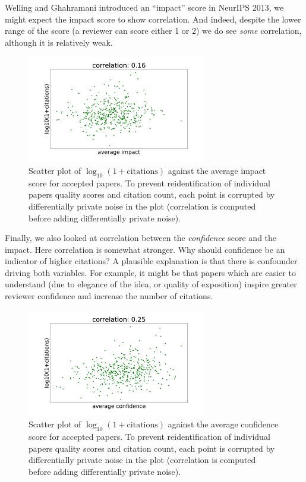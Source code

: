 Welling and Ghahramani introduced an ``impact'' score in NeurIPS 2013,
we might expect the impact score to show correlation. And indeed,
despite the lower range of the score (a reviewer can score either 1 or
2) we do see \emph{some} correlation, although it is relatively weak.

\begin{figure}[htb]
\includegraphics[width=0.70\textwidth]{diagrams/neurips/citations-vs-average-impact-accept.pdf}


\caption{Scatter plot of $\log_{10}(1+\text{citations})$ against the average impact score for accepted papers. To prevent reidentification of individual papers quality scores and citation count, each point is corrupted by differentially private noise in the plot (correlation is computed before adding differentially private noise).}
\label{citations-vs-average-impact-accept}
\end{figure}

Finally, we also looked at correlation between the \emph{confidence}
score and the impact. Here correlation is somewhat stronger. Why should
confidence be an indicator of higher citations? A plausible explanation
is that there is confounder driving both variables. For example, it
might be that papers which are easier to understand (due to elegance of
the idea, or quality of exposition) inspire greater reviewer confidence
and increase the number of citations.

\begin{figure}[htb]
\includegraphics[width=0.70\textwidth]{diagrams/neurips/citations-vs-average-confidence-accept.pdf}


\caption{Scatter plot of $\log_{10}(1+\text{citations})$ against the average confidence score for accepted papers. To prevent reidentification of individual papers quality scores and citation count, each point is corrupted by differentially private noise in the plot (correlation is computed before adding differentially private noise).}
\label{citations-vs-average-confidence-accept}
\end{figure}

